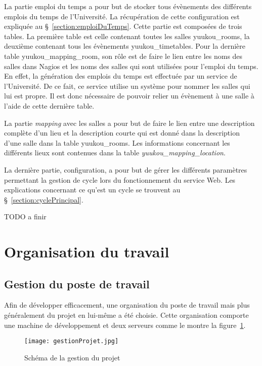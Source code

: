La partie emploi du temps a pour but de stocker tous \'ev\`enements des diff\'erents emplois du temps de l'Universit\'e.
La r\'ecup\'eration de cette configuration est expliqu\'ee au \S~\ref{section:emploiDuTemps}.
Cette partie est compos\'ees de trois tables.
La premi\`ere table est celle contenant toutes les salles \textsf{yuukou\_rooms}, la deuxi\`eme contenant tous les \'ev\`enements \textsf{yuukou\_timetables}.
Pour la derni\`ere table \textsf{yuukou\_mapping\_room}, son r\^ole est de faire le lien entre les noms des salles dans Nagios et les noms des salles qui sont utilis\'ees pour l'emploi du temps.
En effet, la g\'en\'eration des emplois du temps est effectu\'ee par un service de l'Universit\'e.
De ce fait, ce service utilise un syst\`eme pour nommer les salles qui lui est propre.
Il est donc n\'ecessaire de pouvoir relier un \'ev\`enement \`a une salle \`a l'aide de cette derni\`ere table.

La partie \textit{mapping} avec les salles a pour but de faire le lien entre une description compl\`ete d'un lieu et la description courte qui est donn\'e dans la description d'une salle dans la table \textsf{yuukou\_rooms}.
Les informations concernant les diff\'erents lieux sont contenues dans la table \textit{yuukou\_mapping\_location}.

La derni\`ere partie, configuration, a pour but de g\'erer les diff\'erents param\`etres permettant la gestion de cycle lors du fonctionnement du service Web. 
Les explications concernant ce qu'est un cycle se trouvent au \S~\ref{section:cyclePrincipal}.

TODO a finir

\section{Organisation du travail}

\subsection{Gestion du poste de travail}
\label{section:gestionProjet}

Afin de d\'evelopper efficacement, une organisation du poste de travail mais plus g\'en\'eralement du projet en lui-m\^eme a \'et\'e choisie.
Cette organisation comporte une machine de d\'eveloppement et deux serveurs comme le montre la figure~\ref{figure:gestionProjet}.

\begin{figure}[!ht]
	\centering
	\texttt{[image: gestionProjet.jpg]}
	\caption{Sch\'ema de la gestion du projet}
	\label{figure:gestionProjet}

\end{figure}

